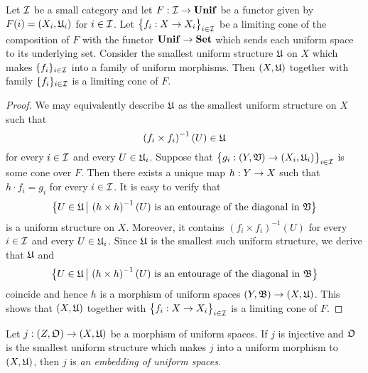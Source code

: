 \begin{theorem}\label{theorem:limits_of_uniform_spaces_description}
Let ${\mathcal I}$ be a small category and let $F:{\mathcal I}\rightarrow \mathbf{Unif}$ be a functor given by $F(i) = (X_i,{\mathfrak U}_i)$ for $i\in {\mathcal I}$. Let $\big\{f_i:X \rightarrow X_i \big\}_{i\in {\mathcal I}}$ be a limiting cone of the composition of $F$ with the functor $\mathbf{Unif} \rightarrow \mathbf{Set}$ which sends each uniform space to its underlying set. Consider the smallest uniform structure ${\mathfrak U}$ on $X$ which makes $\{f_i\}_{i\in {\mathcal I}}$ into a family of uniform morphisms. Then $(X,{\mathfrak U})$ together with family $\{f_i\}_{i\in {\mathcal I}}$ is a limiting cone of $F$.
\end{theorem}
\begin{proof}
We may equivalently describe ${\mathfrak U}$ as the smallest uniform structure on $X$ such that 
$$\left(f_i\times f_i\right)^{-1}(U) \in {\mathfrak U}$$
for every $i\in {\mathcal I}$ and every $U \in {\mathfrak U}_i$. Suppose that $\big\{g_i:(Y,{\mathfrak V}) \rightarrow (X_i,{\mathfrak U}_i)\big\}_{i\in {\mathcal I}}$ is some cone over $F$. Then there exists a unique map $h:Y \rightarrow X$ such that $h\cdot f_i = g_i$ for every $i\in {\mathcal I}$. It is easy to verify that
$$\big\{U\in {\mathfrak U}\,\big|\,\left(h\times h\right)^{-1}(U)\mbox{ is an entourage of the diagonal in }{\mathfrak V}\big\}$$
is a uniform structure on $X$. Moreover, it contains $\left(f_i\times f_i\right)^{-1}(U)$ for every $i\in {\mathcal I}$ and every $U \in {\mathfrak U}_i$. Since ${\mathfrak U}$ is the smallest such uniform structure, we derive that ${\mathfrak U}$ and
$$\big\{U\in {\mathfrak U}\,\big|\,\left(h\times h\right)^{-1}(U)\mbox{ is an entourage of the diagonal in }{\mathfrak B}\big\}$$
coincide and hence $h$ is a morphism of uniform spaces $\left(Y,{\mathfrak B}\right) \rightarrow \left(X,{\mathfrak U}\right)$. This shows that $(X,{\mathfrak U})$ together with $\big\{f_i:X \rightarrow X_i\big\}_{i\in {\mathcal I}}$ is a limiting cone of $F$.
\end{proof}

\begin{definition}
Let $j:\left(Z,{\mathfrak O}\right)\rightarrow \left(X,{\mathfrak U}\right)$ be a morphism of uniform spaces. If $j$ is injective and ${\mathfrak O}$ is the smallest uniform structure which makes $j$ into a uniform morphism to $\left(X,{\mathfrak U}\right)$, then $j$ is \textit{an embedding of uniform spaces}.
\end{definition}

